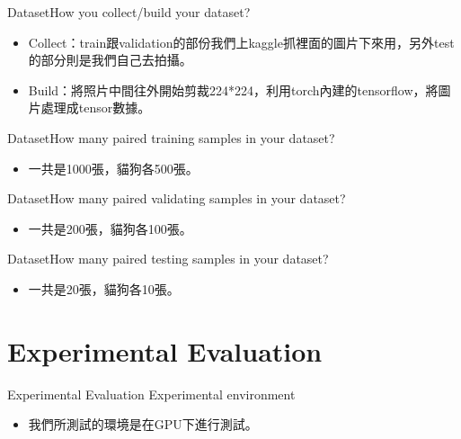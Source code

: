 \documentclass{beamer}
\begin{document}
\begin{frame}{Dataset}{How you collect/build your dataset?}
\begin{CJK*}{UTF8}{bsmi}
  \begin{itemize}
  \item {
    Collect：train跟validation的部份我們上kaggle抓裡面的圖片下來用，另外test的部分則是我們自己去拍攝。
  }
  \item {
    Build：將照片中間往外開始剪裁224*224，利用torch內建的tensorflow，將圖片處理成tensor數據。
  }
  \end{itemize}
\end{CJK*}
\end{frame}

\begin{frame}{Dataset}{How many paired training samples in your dataset?}
\begin{CJK*}{UTF8}{bsmi}
  \begin{itemize}
  \item {
    一共是1000張，貓狗各500張。
  }
  \end{itemize}
\end{CJK*}
\end{frame}

\begin{frame}{Dataset}{How many paired validating samples in your dataset?}
\begin{CJK*}{UTF8}{bsmi}
  \begin{itemize}
  \item {
     一共是200張，貓狗各100張。
  }
  \end{itemize}
\end{CJK*}
\end{frame}

\begin{frame}{Dataset}{How many paired testing samples in your dataset?}
\begin{CJK*}{UTF8}{bsmi}
  \begin{itemize}
  \item {
    一共是20張，貓狗各10張。
  }
  \end{itemize}
\end{CJK*}
\end{frame}




\section{ Experimental Evaluation }

\begin{frame}{ Experimental Evaluation }{Experimental environment}
\begin{CJK*}{UTF8}{bsmi}
  \begin{itemize}
  \item {
    我們所測試的環境是在GPU下進行測試。
  }
  \end{itemize}
\end{CJK*}
\end{frame}
\end{document}
